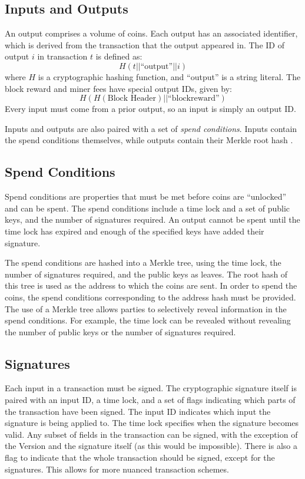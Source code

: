 \documentclass[twocolumn]{article}
\begin{document}
\subsection{Inputs and Outputs}
An output comprises a volume of coins.
Each output has an associated identifier, which is derived from the transaction that the output appeared in.
The ID of output $i$ in transaction $t$ is defined as:
\[
	H(t || \text{``output''} || i)
\]
where $H$ is a cryptographic hashing function, and ``output'' is a string literal.
The block reward and miner fees have special output IDs, given by:
\[
	H(H(\text{Block Header}) || \text{``blockreward''})
\]
Every input must come from a prior output, so an input is simply an output ID.

Inputs and outputs are also paired with a set of \textit{spend conditions}.
Inputs contain the spend conditions themselves, while outputs contain their Merkle root hash \cite{merkle}.

\subsection{Spend Conditions}
Spend conditions are properties that must be met before coins are ``unlocked'' and can be spent.
The spend conditions include a time lock and a set of public keys, and the number of signatures required.
An output cannot be spent until the time lock has expired and enough of the specified keys have added their signature.

The spend conditions are hashed into a Merkle tree, using the time lock, the number of signatures required, and the public keys as leaves.
The root hash of this tree is used as the address to which the coins are sent.
In order to spend the coins, the spend conditions corresponding to the address hash must be provided.
The use of a Merkle tree allows parties to selectively reveal information in the spend conditions.
For example, the time lock can be revealed without revealing the number of public keys or the number of signatures required.

\subsection{Signatures}
Each input in a transaction must be signed.
The cryptographic signature itself is paired with an input ID, a time lock, and a set of flags indicating which parts of the transaction have been signed.
The input ID indicates which input the signature is being applied to.
The time lock specifies when the signature becomes valid.
Any subset of fields in the transaction can be signed, with the exception of the Version and the signature itself (as this would be impossible).
There is also a flag to indicate that the whole transaction should be signed, except for the signatures.
This allows for more nuanced transaction schemes.
\end{document}

